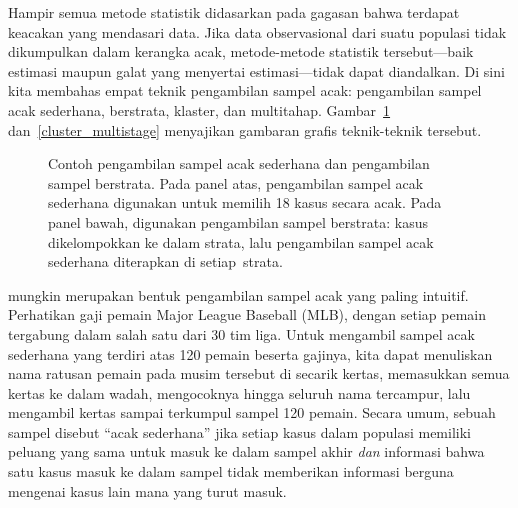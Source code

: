 Hampir semua metode statistik didasarkan pada gagasan bahwa terdapat keacakan
yang mendasari data. Jika data observasional dari suatu populasi tidak
dikumpulkan dalam kerangka acak, metode-metode statistik tersebut---baik
estimasi maupun galat yang menyertai estimasi---tidak dapat diandalkan. Di sini
kita membahas empat teknik pengambilan sampel acak: pengambilan sampel acak
sederhana, berstrata, klaster, dan multitahap. Gambar~\ref{simple_stratified}
dan~\ref{cluster_multistage} menyajikan gambaran grafis teknik-teknik tersebut.

\begin{figure}
  \centering
  \caption{
      Contoh pengambilan sampel acak sederhana
      dan pengambilan sampel berstrata.
      Pada panel atas, pengambilan sampel acak sederhana digunakan untuk
      memilih 18 kasus secara acak. Pada panel bawah, digunakan pengambilan
      sampel berstrata: kasus dikelompokkan ke dalam strata, lalu pengambilan
      sampel acak sederhana diterapkan di \mbox{setiap strata}.}
  \label{simple_stratified}
\end{figure}

mungkin merupakan bentuk pengambilan sampel acak yang paling intuitif.
Perhatikan gaji pemain Major League Baseball (MLB), dengan setiap pemain
tergabung dalam salah satu dari 30 tim liga. Untuk mengambil sampel acak
sederhana yang terdiri atas 120 pemain beserta gajinya, kita dapat menuliskan
nama ratusan pemain pada musim tersebut di secarik kertas, memasukkan semua
kertas ke dalam wadah, mengocoknya hingga seluruh nama tercampur, lalu
mengambil kertas sampai terkumpul sampel 120 pemain. Secara umum, sebuah
sampel disebut ``acak sederhana'' jika setiap kasus dalam populasi memiliki
peluang yang sama untuk masuk ke dalam sampel akhir \emph{dan} informasi bahwa
satu kasus masuk ke dalam sampel tidak memberikan informasi berguna mengenai
kasus lain mana yang turut masuk.

